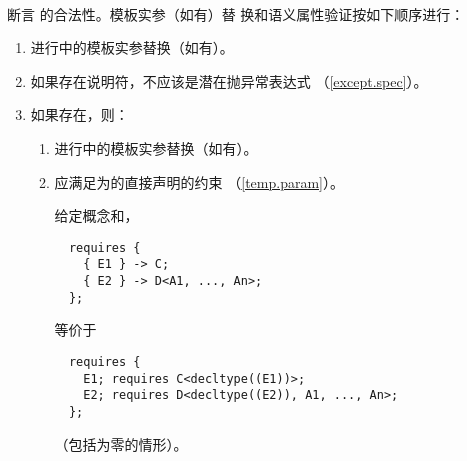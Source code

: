 
\paragraph{} %
断言 的合法性。模板实参（如有）替
换和语义属性验证按如下顺序进行：
\begin{enumerate}
  \item 进行中的模板实参替换（如有）。
  \item 如果存在说明符，不应该是潜在抛异常表达式
    （\ref{except.spec}）。
  \item 如果存在，则：
    \begin{enumerate}
      \item 进行中的模板实参替换（如有）。
      \item 应满足为的直接声明的约束
        （\ref{temp.param}）。

        \begin{example}
          给定概念和，
          \begin{lstlisting}
  requires {
    { E1 } -> C;
    { E2 } -> D<A1, ..., An>;
  };
          \end{lstlisting}
          等价于
          \begin{lstlisting}
  requires {
    E1; requires C<decltype((E1))>;
    E2; requires D<decltype((E2)), A1, ..., An>; 
  };
          \end{lstlisting}
          （包括为零的情形）。
        \end{example}
    \end{enumerate}
\end{enumerate}

